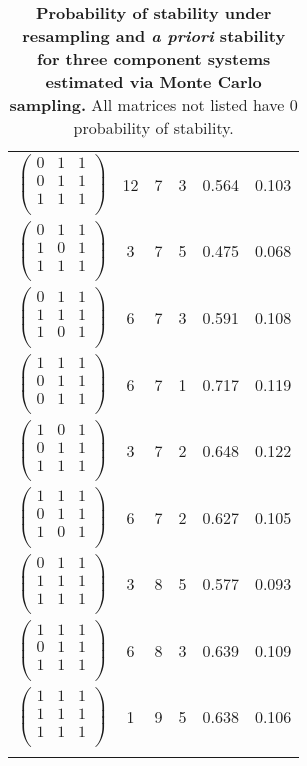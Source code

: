 \begin{longtable}{ c | c || c | c | c | c }
$\begin{pmatrix}
0 & 1 & 1\\
0 & 1 & 1\\
1 & 1 & 1\\
\end{pmatrix}$ & 12 & 7 & 3 & 0.564 & 0.103\\
$\begin{pmatrix}
0 & 1 & 1\\
1 & 0 & 1\\
1 & 1 & 1\\
\end{pmatrix}$ & 3 & 7 & 5 & 0.475 & 0.068\\
$\begin{pmatrix}
0 & 1 & 1\\
1 & 1 & 1\\
1 & 0 & 1\\
\end{pmatrix}$ & 6 & 7 & 3 & 0.591 & 0.108\\
$\begin{pmatrix}
1 & 1 & 1\\
0 & 1 & 1\\
0 & 1 & 1\\
\end{pmatrix}$ & 6 & 7 & 1 & 0.717 & 0.119\\
$\begin{pmatrix}
1 & 0 & 1\\
0 & 1 & 1\\
1 & 1 & 1\\
\end{pmatrix}$ & 3 & 7 & 2 & 0.648 & 0.122\\
$\begin{pmatrix}
1 & 1 & 1\\
0 & 1 & 1\\
1 & 0 & 1\\
\end{pmatrix}$ & 6 & 7 & 2 & 0.627 & 0.105\\
$\begin{pmatrix}
0 & 1 & 1\\
1 & 1 & 1\\
1 & 1 & 1\\
\end{pmatrix}$ & 3 & 8 & 5 & 0.577 & 0.093\\
$\begin{pmatrix}
1 & 1 & 1\\
0 & 1 & 1\\
1 & 1 & 1\\
\end{pmatrix}$ & 6 & 8 & 3 & 0.639 & 0.109\\
$\begin{pmatrix}
1 & 1 & 1\\
1 & 1 & 1\\
1 & 1 & 1\\
\end{pmatrix}$ & 1 & 9 & 5 & 0.638 & 0.106\\
\caption{{\bf Probability of stability under resampling and \emph{a priori} stability for three component systems estimated via Monte Carlo sampling.} All matrices not listed have $0$ probability of stability.}\label{tab:structstabmat3}
\end{longtable}
